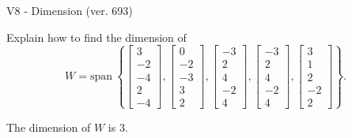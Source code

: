 \begin{exercise}
  \begin{exerciseTitle}V8 - Dimension (ver. 693)\end{exerciseTitle}
  \begin{exerciseStatement}
    Explain how to find the dimension of 
\[W=\mathrm{span}\ \left\{\left[\begin{array}{r}
3 \\
-2 \\
-4 \\
2 \\
-4
\end{array}\right] , \left[\begin{array}{r}
0 \\
-2 \\
-3 \\
3 \\
2
\end{array}\right] , \left[\begin{array}{r}
-3 \\
2 \\
4 \\
-2 \\
4
\end{array}\right] , \left[\begin{array}{r}
-3 \\
2 \\
4 \\
-2 \\
4
\end{array}\right] , \left[\begin{array}{r}
3 \\
1 \\
2 \\
-2 \\
2
\end{array}\right]\right\}.\]



  \end{exerciseStatement}
  \begin{exerciseAnswer}
   The dimension of \(W\) is  \(3\).
  


  \end{exerciseAnswer}
\end{exercise}